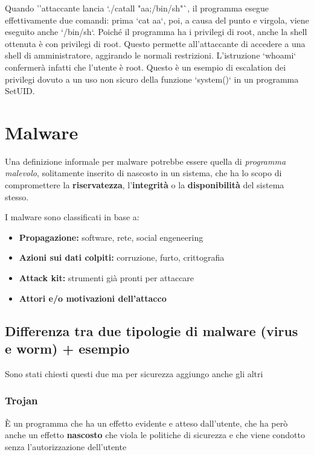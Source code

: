\documentclass{report}
\begin{document}
Quando '’attaccante lancia `./catall "aa;/bin/sh"`, il programma esegue effettivamente due comandi: prima `cat aa`, poi, a causa del punto e virgola, viene eseguito anche `/bin/sh`. Poiché il programma ha i privilegi di root, anche la shell ottenuta è con privilegi di root. Questo permette all’attaccante di accedere a una shell di amministratore, aggirando le normali restrizioni. L'istruzione `whoami` confermerà infatti che l’utente è root. Questo è un esempio di escalation dei privilegi dovuto a un uso non sicuro della funzione `system()` in un programma SetUID.







\chapter{Malware}
\noindent Una definizione informale per malware potrebbe essere quella di \textit{programma malevolo},
solitamente inserito di nascosto in un sistema, che ha lo scopo di compromettere la \textbf{riservatezza}, l'\textbf{integrità} o la \textbf{disponibilità} 
del sistema stesso.

\noindent I malware sono classificati in base a:
\begin{itemize}
    \item \textbf{Propagazione:} software, rete, social engeneering
    \item \textbf{Azioni sui dati colpiti:} corruzione, furto, crittografia
    \item \textbf{Attack kit:} strumenti già pronti per attaccare
    \item \textbf{Attori e/o motivazioni dell'attacco}
\end{itemize}

\section{Differenza tra due tipologie di malware (virus e worm) + esempio}
\noindent Sono stati chiesti questi due ma per sicurezza aggiungo anche gli altri
\subsection{Trojan}
È un programma che ha un effetto evidente e atteso dall'utente, che ha però anche un 
effetto \textbf{nascosto} che viola le politiche di sicurezza e che viene condotto senza l'autorizzazione 
dell'utente
\end{document}
